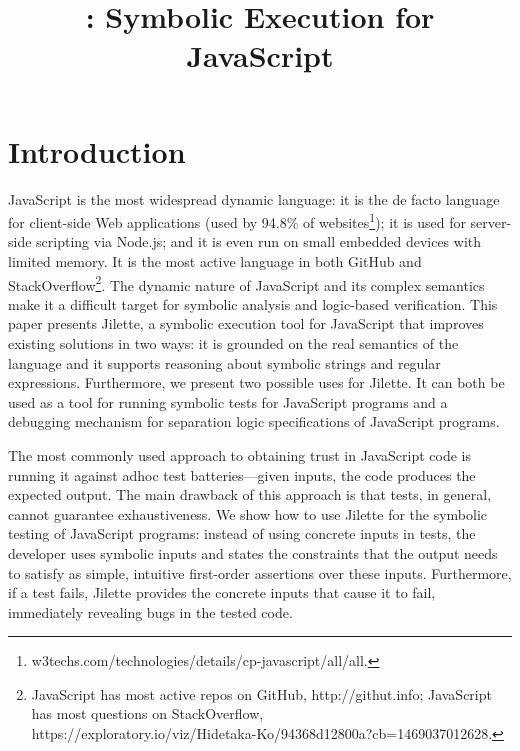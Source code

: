 \documentclass{llncs}
\title{\jilette: Symbolic Execution for JavaScript}
\author{}
\institute{Imperial College London, IBM New York}
\newcommand{\jilette}{Jilette\xspace}
\newcommand{\myparagraph}[1]{\smallskip\noindent {\bf #1.}\hspace{1pt}}
\begin{document}
%

\maketitle 

\begin{abstract}

\end{abstract}


\section{Introduction}

JavaScript is the most widespread dynamic language: it is the de facto language for client-side Web
applications (used by 94.8\% of websites\footnote{w3techs.com/technologies/details/cp-javascript/all/all.});
it is used for server-side scripting via Node.js; and it is even run on small embedded devices with limited 
memory. It is the most active language in both GitHub and StackOverflow\footnote{JavaScript  has most active
 repos on GitHub, http://githut.info; JavaScript has most questions on 
 StackOverflow, \\https://exploratory.io/viz/Hidetaka-Ko/94368d12800a?cb=1469037012628.}.
The dynamic nature of JavaScript and its complex semantics make it a difficult target for
symbolic analysis and logic-based verification. 
This paper presents \jilette, a symbolic execution tool for JavaScript that improves existing solutions
in two ways:  it is grounded on the real semantics of the language and 
 it supports reasoning about symbolic strings and regular expressions. 
%
Furthermore, we present two possible uses for \jilette. It can both be used as  a tool for
 running symbolic tests for JavaScript programs and  a debugging mechanism for separation 
 logic specifications of JavaScript programs. 

\myparagraph{Symbolic Testing} The most commonly used 
approach to obtaining trust in JavaScript code is running it against 
adhoc test batteries---given inputs, the code produces the expected
output. The main drawback of this approach is that tests, in general,
cannot guarantee exhaustiveness. We show how to use \jilette
for the symbolic testing of JavaScript programs: instead of using concrete 
inputs in tests, the developer uses symbolic inputs and states the 
constraints that the output needs to satisfy as simple, intuitive 
first-order assertions over these inputs. 
Furthermore, if a test fails, Jilette provides the concrete inputs that cause it 
to fail, immediately revealing bugs in the tested code.
\end{document}
